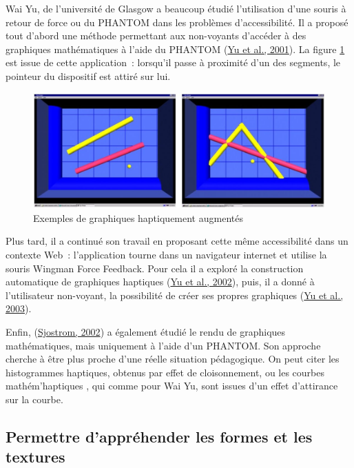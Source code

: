 \documentclass[
]{book}
\begin{document}
Wai Yu, de l'université de Glasgow a beaucoup étudié l'utilisation d'une
souris à retour de force ou du PHANTOM dans les problèmes d'accessibilité. Il
a proposé tout d'abord une méthode permettant aux non-voyants d'accéder à des
graphiques mathématiques à l'aide du PHANTOM (\protect\hyperlink{ref-yu2001haptic}{Yu et al., 2001}). La
figure \ref{fig:haptiquement} est issue de cette application~: lorsqu'il
passe à proximité d'un des segments, le pointeur du dispositif est attiré sur
lui.

\begin{figure}
\centering
\includegraphics{img/hapticGraphs.jpg}
\caption{\label{fig:haptiquement}Exemples de graphiques haptiquement augmentés}
\end{figure}

Plus tard, il a continué son travail en proposant cette même accessibilité
dans un contexte Web~: l'application tourne dans un navigateur internet et
utilise la souris Wingman Force Feedback. Pour cela il a exploré la
construction automatique de graphiques haptiques (\protect\hyperlink{ref-yu2002automatic}{Yu et al., 2002}), puis, il
a donné à l'utilisateur non-voyant, la possibilité de créer ses propres
graphiques (\protect\hyperlink{ref-yu2003web}{Yu et al., 2003}).

Enfin, (\protect\hyperlink{ref-sjostrom2002non}{Sjostrom, 2002}) a également
étudié le rendu de graphiques mathématiques, mais uniquement à l'aide d'un
PHANTOM. Son approche cherche à être plus proche d'une réelle situation
pédagogique. On peut citer les histogrammes haptiques, obtenus par effet de
cloisonnement, ou les courbes mathém'haptiques , qui comme pour Wai Yu, sont
issues d'un effet d'attirance sur la courbe.

\hypertarget{permettre-dappruxe9hender-les-formes-et-les-textures}{%
\subsection{Permettre d'appréhender les formes et les textures}\label{permettre-dappruxe9hender-les-formes-et-les-textures}}
\end{document}
